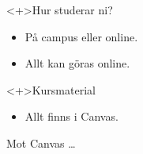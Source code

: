 \begin{frame}
  \begin{block}<+>{Hur studerar ni?}
    \begin{itemize}
      \item På campus eller online.
      \item Allt kan göras online.
    \end{itemize}
  \end{block}

  \begin{block}<+>{Kursmaterial}
    \begin{itemize}
      \item Allt finns i Canvas.
    \end{itemize}
  \end{block}
\end{frame}

\begin{frame}[fragile]
  \begin{center}
    Mot Canvas \dots
  \end{center}
\end{frame}
